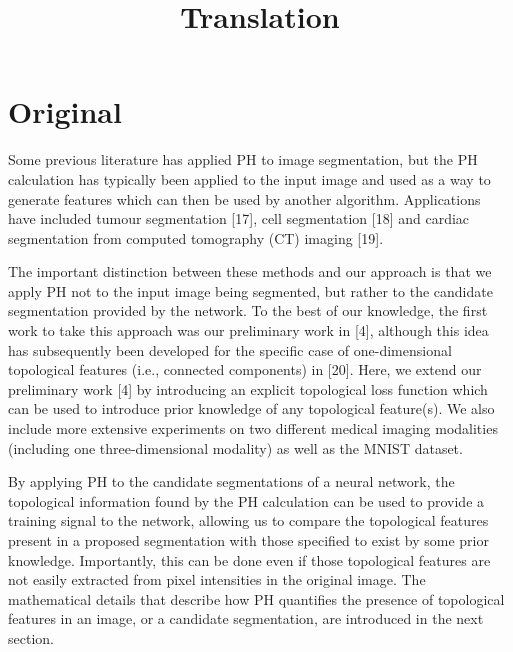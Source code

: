 \documentclass[12pt,a4paper]{article}
\title{Translation \\}
\author{}
\date{}
\begin{document}
\maketitle

\section*{Original}

Some previous literature has applied PH to image segmentation, but
the PH calculation has typically been applied to the input image and
used as a way to generate features which can then be used by another
algorithm. Applications have included tumour segmentation [17], cell
segmentation [18] and cardiac segmentation from computed tomography
(CT) imaging [19].

The important distinction between these methods and our approach is
that we apply PH not to the input image being segmented, but rather
to the candidate segmentation provided by the network. To the best
of our knowledge, the first work to take this approach was our
preliminary work in [4], although this idea has subsequently been
developed for the specific case of one-dimensional topological
features (i.e., connected components) in [20]. Here, we extend our
preliminary work [4] by introducing an explicit topological loss
function which can be used to introduce prior knowledge of any
topological feature(s). We also include more extensive experiments
on two different medical imaging modalities (including one
three-dimensional modality) as well as the MNIST dataset.

By applying PH to the candidate segmentations of a neural network,
the topological information found by the PH calculation can be used
to provide a training signal to the network, allowing us to compare
the topological features present in a proposed segmentation with
those specified to exist by some prior knowledge. Importantly, this
can be done even if those topological features are not easily
extracted from pixel intensities in the original image. The
mathematical details that describe how PH quantifies the presence of
topological features in an image, or a candidate segmentation, are
introduced in the next section.
\end{document}
